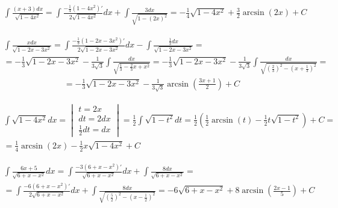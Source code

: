 
\begin{gather*}\int \frac{(x+3)dx}{\sqrt{1-4x^2}} = \int \frac{-\frac{1}{4}(1-4x^2)'}{2\sqrt{1-4x^2}}dx + \int \frac{3dx}{\sqrt{1-(2x)^2}} = -\frac{1}{4}\sqrt{1-4x^2}+\frac{3}{2}\arcsin(2x)+C \end{gather*}



\begin{gather*}\int \frac{xdx}{\sqrt{1-2x-3x^2}}=\int \frac{-\frac{1}{3}(1-2x-3x^2)'}{2\sqrt{1-2x-3x^2}}dx-\int \frac{\frac{1}{3}dx}{\sqrt{1-2x-3x^2}} = \\  = -\frac{1}{3}\sqrt{1-2x-3x^2}-\frac{1}{3\sqrt{3}}\int \frac{dx}{\sqrt{\frac{1}{3}-\frac{2}{3}x+x^2}} = -\frac{1}{3}\sqrt{1-2x-3x^2}-\frac{1}{3\sqrt{3}}\int \frac{dx}{\sqrt{(\frac{2}{3})^2-(x+\frac{1}{3})^2}} = \end{gather*}
\begin{gather*}= -\frac{1}{3}\sqrt{1-2x-3x^2} - \frac{1}{3\sqrt{3}}\arcsin \left(\frac{3x+1}{2}\right)+C \end{gather*}



\begin{gather*}\int \sqrt{1-4x^2}dx = \begin{vmatrix} t=2x \\ dt=2dx \\ \frac{1}{2}dt=dx \end{vmatrix} = \frac{1}{2}\int \sqrt{1-t^2}dt = \frac{1}{2} \left( \frac{1}{2}\arcsin (t) - \frac{1}{2}t\sqrt{1-t^2} \right)+C = \\ = \frac{1}{4}\arcsin (2x) - \frac{1}{2}x\sqrt{1-4x^2}+C\end{gather*}



\begin{gather*}\int \frac{6x+5}{\sqrt{6+x-x^2}}dx = \int \frac{-3(6+x-x^2)'}{\sqrt{6+x-x^2}}dx+\int \frac{8dx}{\sqrt{6+x-x^2}} = \\  = \int \frac{-6(6+x-x^2)'}{2\sqrt{6+x-x^2}}dx+\int \frac{8dx}{\sqrt{(\frac{5}{2})^2-(x-\frac{1}{2})^2}} = -6\sqrt{6+x-x^2}+8\arcsin \left(\frac{2x-1}{5}\right)+C \end{gather*}


